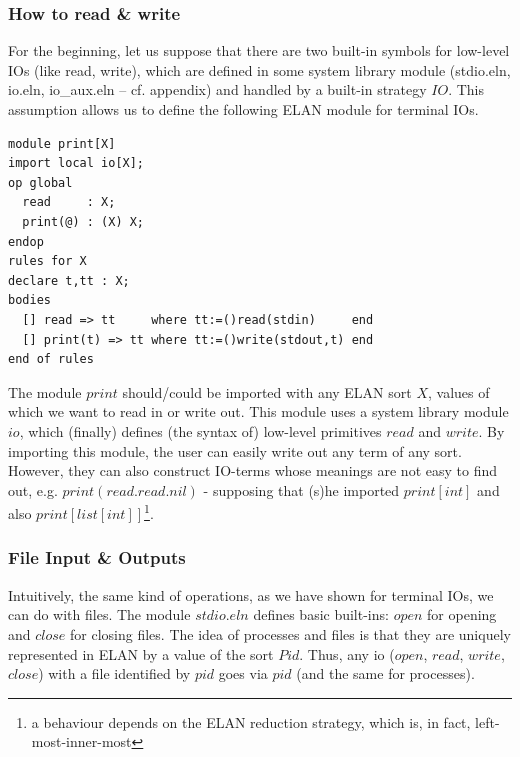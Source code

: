 \documentclass{article}
\begin{document}
{\scriptsize
\subsubsection{How to read \& write}

For the beginning, let us suppose that there are two built-in symbols 
for low-level IOs (like read, write), which are defined in some
system library module (stdio.eln, io.eln, io\_aux.eln -- cf. appendix)
and handled by a built-in strategy $IO$. This assumption allows us to define the
following ELAN module for terminal IOs.
{\scriptsize
\begin{verbatim}
module print[X]
import local io[X];
op global 
  read     : X;
  print(@) : (X) X;
endop
rules for X
declare t,tt : X;
bodies
  [] read => tt     where tt:=()read(stdin)     end
  [] print(t) => tt where tt:=()write(stdout,t) end
end of rules
\end{verbatim}
}
%
The module $print$ should/could be imported with any ELAN sort $X$,
values of which we want to read in or write out. 
This module uses a system library module
$io$, which (finally) defines (the syntax of) low-level primitives 
$read$ and $write$.
By importing this module, the user can easily write out any term of any
sort. However, they can also construct IO-terms whose meanings are
not easy to find out, e.g. $print(read.read.nil)$ - supposing that (s)he
imported $print[int]$ and also $print[list[int]]$\footnote{
a behaviour depends on the ELAN reduction strategy, which is, in fact, 
left-most-inner-most}.

\subsubsection{File Input \& Outputs}

Intuitively, the same kind of operations, as we have shown for terminal IOs,
we can do with files. The module $stdio.eln$ defines basic built-ins:
$open$ for opening and $close$ for closing files. The idea of
processes and files is that they are uniquely represented in ELAN 
by a value of the sort $Pid$. Thus, any io ($open$, $read$, $write$, $close$)
with a file identified by $pid$ goes via $pid$ (and the same for processes).

}
\end{document}
